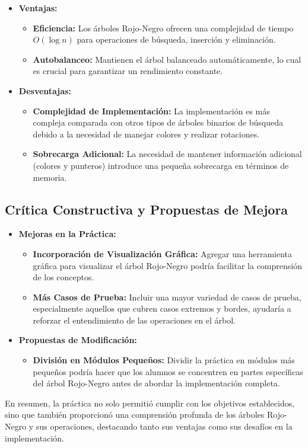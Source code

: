 \documentclass[12pt]{article}
\begin{document}
\begin{itemize}
    \item \textbf{Ventajas:}
    \begin{itemize}
        \item \textbf{Eficiencia:} Los árboles Rojo-Negro ofrecen una complejidad de tiempo \(O(\log n)\) para operaciones de búsqueda, inserción y eliminación.
        \item \textbf{Autobalanceo:} Mantienen el árbol balanceado automáticamente, lo cual es crucial para garantizar un rendimiento constante.
    \end{itemize}
    \item \textbf{Desventajas:}
    \begin{itemize}
        \item \textbf{Complejidad de Implementación:} La implementación es más compleja comparada con otros tipos de árboles binarios de búsqueda debido a la necesidad de manejar colores y realizar rotaciones.
        \item \textbf{Sobrecarga Adicional:} La necesidad de mantener información adicional (colores y punteros) introduce una pequeña sobrecarga en términos de memoria.
    \end{itemize}
\end{itemize}

\subsection*{Crítica Constructiva y Propuestas de Mejora}

\begin{itemize}
    \item \textbf{Mejoras en la Práctica:}
    \begin{itemize}
        \item \textbf{Incorporación de Visualización Gráfica:} Agregar una herramienta gráfica para visualizar el árbol Rojo-Negro podría facilitar la comprensión de los conceptos.
        \item \textbf{Más Casos de Prueba:} Incluir una mayor variedad de casos de prueba, especialmente aquellos que cubren casos extremos y bordes, ayudaría a reforzar el entendimiento de las operaciones en el árbol.
    \end{itemize}
    \item \textbf{Propuestas de Modificación:}
    \begin{itemize}
        \item \textbf{División en Módulos Pequeños:} Dividir la práctica en módulos más pequeños podría hacer que los alumnos se concentren en partes específicas del árbol Rojo-Negro antes de abordar la implementación completa.
    \end{itemize}
\end{itemize}

En resumen, la práctica no solo permitió cumplir con los objetivos establecidos, sino que también proporcionó una comprensión profunda de los árboles Rojo-Negro y sus operaciones, destacando tanto sus ventajas como sus desafíos en la implementación.
\end{document}
